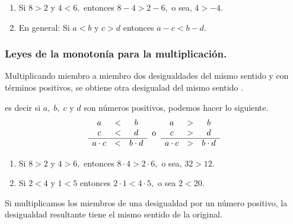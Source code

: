 \begin{ejemplos}
\begin{enumerate}
\item Si $8>2$ y $4<6,$ entonces $8-4>2-6,$ o sea, $4>-4.$
\item En general: Si $a<b$ y $c>d$ entonces $a-c<b-d$.
\end{enumerate}
\end{ejemplos}

\subsubsection{Leyes de la monotonía para la multiplicación. \vspace*{10pt}
}

\begin{ley}{}

Multiplicando miembro a miembro dos desigualdades del mismo sentido
y con términos positivos, se obtiene otra desigualad del mismo sentido
.

\end{ley}

es decir si $a,\;b,\;c$ y $d$ son números positivos, podemos hacer
lo siguiente. 
\[
\begin{array}{ccc}
a & < & b\\
c & < & d\\
\hline a\cdot c & < & b\cdot d
\end{array}\;\;\text{o\;\;\ensuremath{\begin{array}{ccc}
 \text{\text{\ensuremath{a}}}  &  >  &  \text{\ensuremath{b}}\\
 \text{\ensuremath{c}}  &  >  &  \text{\ensuremath{d}}\\
\hline  \text{\ensuremath{a\cdot c}}  &  >  &  \text{\ensuremath{b\cdot d}} 
\end{array}}}
\]
\begin{ejemplos}
\begin{enumerate}
\item Si $8>2$ y $4>6,$ entonces $8\cdot4>2\cdot6,$ o sea, $32>12.$
\item  Si $2<4$ y $1<5$ entonces $2\cdot1<4\cdot5,$ o sea $2<20$.
\end{enumerate}
\end{ejemplos}

\begin{ley}{}

Si multiplicamos los miembros de una desigualdad por un número positivo,
la desigualdad resultante tiene el mismo sentido de la original.

\end{ley}

